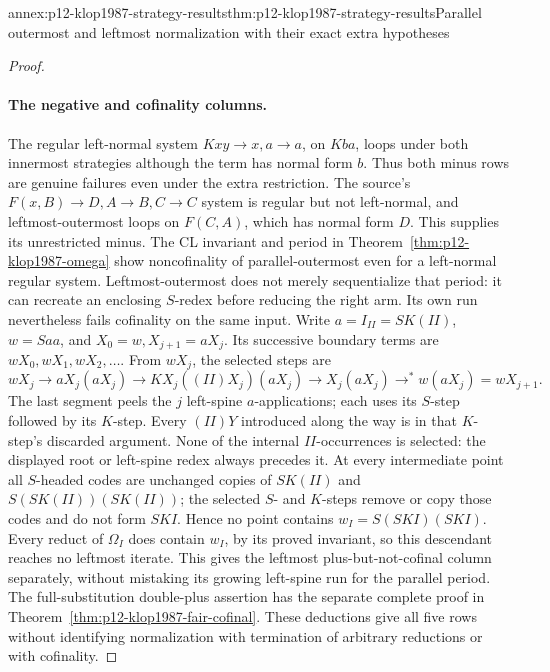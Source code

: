 \begin{annexitem}{annex:p12-klop1987-strategy-results}{thm:p12-klop1987-strategy-results}{Parallel outermost and leftmost normalization with their exact extra hypotheses}
\begin{proof}
\paragraph{The negative and cofinality columns.}
The regular left-normal system \(Kxy\to x,a\to a\), on
\(Kba\), loops under both innermost strategies although the term
has normal form \(b\). Thus both minus rows are genuine failures
even under the extra restriction. The source's
\(F(x,B)\to D,A\to B,C\to C\) system is regular but not
left-normal, and leftmost-outermost loops on \(F(C,A)\), which
has normal form \(D\). This supplies its unrestricted minus.
The CL invariant and period in Theorem~\ref{thm:p12-klop1987-omega}
show noncofinality of parallel-outermost even for a left-normal regular
system. Leftmost-outermost does not merely sequentialize that period:
it can recreate an enclosing \(S\)-redex before reducing the right arm.
Its own run nevertheless fails cofinality on the same input. Write
\(a=I_{II}=SK(II)\), \(w=Saa\), and
\(X_0=w,X_{j+1}=aX_j\). Its successive boundary terms are
\(wX_0,wX_1,wX_2,\ldots\). From \(wX_j\), the selected steps are
\[
 wX_j\to aX_j(aX_j)
 \to KX_j((II)X_j)(aX_j)\to X_j(aX_j)
 \to^*w(aX_j)=wX_{j+1}.
\]
The last segment peels the \(j\) left-spine \(a\)-applications;
each uses its \(S\)-step followed by its \(K\)-step. Every
\((II)Y\) introduced along the way is in that \(K\)-step's
discarded argument. None of the internal \(II\)-occurrences is
selected: the displayed root or left-spine redex always precedes it.
At every intermediate point all \(S\)-headed codes are unchanged
copies of \(SK(II)\) and \(S(SK(II))(SK(II))\); the selected
\(S\)- and \(K\)-steps remove or copy those codes and do not form
\(SKI\). Hence no point contains \(w_I=S(SKI)(SKI)\).
Every reduct of \(\Omega_I\) does contain \(w_I\), by its
proved invariant, so this descendant reaches no leftmost iterate.
This gives the leftmost plus-but-not-cofinal column separately, without
mistaking its growing left-spine run for the parallel period.
The full-substitution double-plus assertion has the separate complete
proof in Theorem~\ref{thm:p12-klop1987-fair-cofinal}. These deductions
give all five rows without identifying normalization with termination
of arbitrary reductions or with cofinality.
\end{proof}
\end{annexitem}


